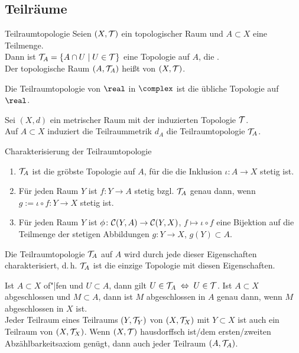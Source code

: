 \subsection{%
    Teilräume%
}

\begin{Def}{Teilraumtopologie}
    Seien $(X, \mathcal{T})$ ein topologischer Raum und $A \subset X$ eine Teilmenge. \\
    Dann ist $\mathcal{T}_A = \{A \cap U \;|\; U \in \mathcal{T}\}$ eine Topologie auf $A$,
    die . \\
    Der topologische Raum $(A, \mathcal{T}_A)$ heißt  von $(X, \mathcal{T})$.
\end{Def}

\begin{Bsp}
    Die Teilraumtopologie von $\real$ in $\complex$ ist die übliche Topologie
    auf $\real$.
\end{Bsp}

\begin{Bem}
    Sei $(X, d)$ ein metrischer Raum mit der induzierten Topologie $\mathcal{T}$. \\
    Auf $A \subset X$ induziert die Teilraummetrik $d_A$ die Teilraumtopologie
    $\mathcal{T}_A$.
\end{Bem}

\begin{Satz}{Charakterisierung der Teilraumtopologie}
    \begin{enumerate}
        \item
        $\mathcal{T}_A$ ist die gröbste Topologie auf $A$, für die die Inklusion
        $\iota\colon A \rightarrow X$ stetig ist.

        \item
        Für jeden Raum $Y$ ist $f\colon Y \rightarrow A$ stetig bzgl. $\mathcal{T}_A$
        genau dann, wenn $g := \iota \circ f\colon Y \rightarrow X$ stetig ist.

        \item
        Für jeden Raum $Y$ ist $\phi\colon \mathcal{C}(Y, A) \rightarrow \mathcal{C}(Y, X)$,
        $f \mapsto \iota \circ f$ eine Bijektion auf die Teilmenge der
        stetigen Abbildungen $g\colon Y \rightarrow X$, $g(Y) \subset A$.
    \end{enumerate}
    Die Teilraumtopologie $\mathcal{T}_A$ auf $A$ wird durch jede dieser Eigenschaften
    charakterisiert, d.\,h. $\mathcal{T}_A$ ist die einzige Topologie mit diesen
    Eigenschaften.
\end{Satz}

\begin{Bem}
    Ist $A \subset X$ of"|fen und $U \subset A$,
    dann gilt $U \in \mathcal{T}_A \;\Leftrightarrow\; U \in \mathcal{T}$.
    Ist $A \subset X$ abgeschlossen und $M \subset A$,
    dann ist $M$ abgeschlossen in $A$ genau dann, wenn $M$ abgeschlossen
    in $X$ ist. \\
    Jeder Teilraum eines Teilraums $(Y, \mathcal{T}_Y)$ von $(X, \mathcal{T}_X)$ mit
    $Y \subset X$ ist auch ein Teilraum von $(X, \mathcal{T}_X)$.
    Wenn $(X, \mathcal{T})$ hausdorffsch ist/dem ersten/zweiten Abzählbarkeitsaxiom
    genügt, dann auch jeder Teilraum $(A, \mathcal{T}_A)$.
\end{Bem}

